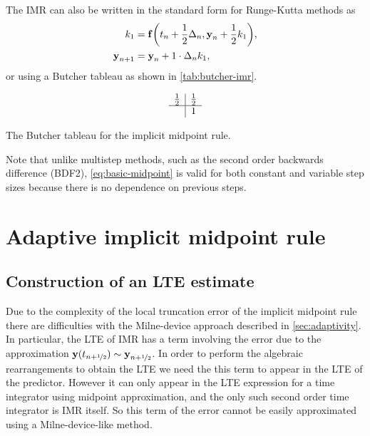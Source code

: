 The IMR can also be written in the standard form for Runge-Kutta methods as
\begin{equation}
  \begin{aligned}
    k_1 &= {\boldsymbol{\mathrm{f}}{\left( t_n + \frac{1}{2} \Delta_{n}, \boldsymbol{\mathrm{y}}_n + \frac{1}{2} k_1 \right)}}, \\
    \boldsymbol{\mathrm{y}}_{n+1} &= \boldsymbol{\mathrm{y}}_n + 1 \cdot \Delta_{n} k_1,
  \end{aligned}
\end{equation}
or using a Butcher tableau \cite[135]{HairerNorsettWanner} as shown in \cref{tab:butcher-imr}.

\begin{table}
  \begin{equation*}
    \begin{array}{c|c}
      \frac{1}{2}  &     \frac{1}{2}  \\
      \hline
                   & 1 \\
    \end{array}
  \end{equation*}
  \caption{The Butcher tableau for the implicit midpoint rule.}
  \label{tab:butcher-imr}
\end{table}

Note that unlike multistep methods, such as the second order backwards difference (BDF2), \cref{eq:basic-midpoint} is valid for both constant and variable step sizes because there is no dependence on previous steps.


\section{Adaptive implicit midpoint rule}

\subsection{Construction of an LTE estimate}

Due to the complexity of the local truncation error of the implicit midpoint rule there are difficulties with the Milne-device approach described in \cref{sec:adaptivity}.
In particular, the LTE of IMR has a term involving the error due to the approximation $\boldsymbol{\mathrm{y}}(t_{n+\nicefrac{1}{2}}) \sim \boldsymbol{\mathrm{y}}_{n+\nicefrac{1}{2}}$.
In order to perform the algebraic rearrangements to obtain the LTE we need the this term to appear in the LTE of the predictor.
However it can only appear in the LTE expression for a time integrator using midpoint approximation, and the only such second order time integrator is IMR itself.
So this term of the error cannot be easily approximated using a Milne-device-like method.

